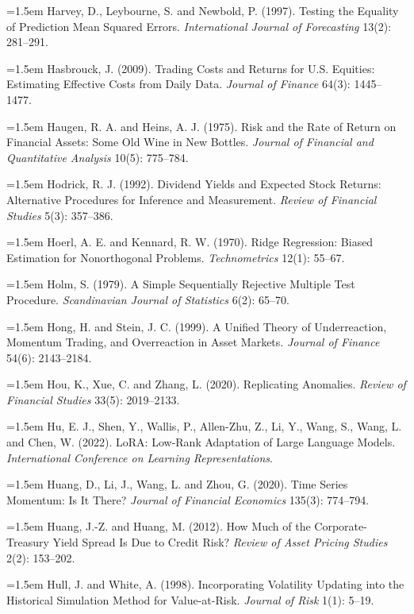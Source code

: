 \hangindent=1.5em Harvey, D., Leybourne, S. and Newbold, P. (1997). Testing the Equality of Prediction Mean Squared Errors. \emph{International Journal of Forecasting} 13(2): 281--291.

\hangindent=1.5em Hasbrouck, J. (2009). Trading Costs and Returns for U.S. Equities: Estimating Effective Costs from Daily Data. \emph{Journal of Finance} 64(3): 1445--1477.

\hangindent=1.5em Haugen, R. A. and Heins, A. J. (1975). Risk and the Rate of Return on Financial Assets: Some Old Wine in New Bottles. \emph{Journal of Financial and Quantitative Analysis} 10(5): 775--784.

\hangindent=1.5em Hodrick, R. J. (1992). Dividend Yields and Expected Stock Returns: Alternative Procedures for Inference and Measurement. \emph{Review of Financial Studies} 5(3): 357--386.

\hangindent=1.5em Hoerl, A. E. and Kennard, R. W. (1970). Ridge Regression: Biased Estimation for Nonorthogonal Problems. \emph{Technometrics} 12(1): 55--67.

\hangindent=1.5em Holm, S. (1979). A Simple Sequentially Rejective Multiple Test Procedure. \emph{Scandinavian Journal of Statistics} 6(2): 65--70.

\hangindent=1.5em Hong, H. and Stein, J. C. (1999). A Unified Theory of Underreaction, Momentum Trading, and Overreaction in Asset Markets. \emph{Journal of Finance} 54(6): 2143--2184.

\hangindent=1.5em Hou, K., Xue, C. and Zhang, L. (2020). Replicating Anomalies. \emph{Review of Financial Studies} 33(5): 2019--2133.

\hangindent=1.5em Hu, E. J., Shen, Y., Wallis, P., Allen-Zhu, Z., Li, Y., Wang, S., Wang, L. and Chen, W. (2022). LoRA: Low-Rank Adaptation of Large Language Models. \emph{International Conference on Learning Representations}.

\hangindent=1.5em Huang, D., Li, J., Wang, L. and Zhou, G. (2020). Time Series Momentum: Is It There? \emph{Journal of Financial Economics} 135(3): 774--794.

\hangindent=1.5em Huang, J.-Z. and Huang, M. (2012). How Much of the Corporate-Treasury Yield Spread Is Due to Credit Risk? \emph{Review of Asset Pricing Studies} 2(2): 153--202.

\hangindent=1.5em Hull, J. and White, A. (1998). Incorporating Volatility Updating into the Historical Simulation Method for Value-at-Risk. \emph{Journal of Risk} 1(1): 5--19.

